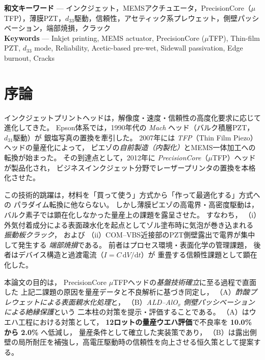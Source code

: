 \documentclass[conference]{IEEEtran}
\begin{document}
\begin{IEEEkeywords}
\textbf{和文キーワード} — インクジェット，MEMSアクチュエータ，PrecisionCore（$\mu$TFP），薄膜PZT，$d_{33}$駆動，信頼性，アセティック系プレウェット，側壁パッシベーション，端部焼損，クラック \\
\textbf{Keywords} — Inkjet printing, MEMS actuator, PrecisionCore ($\mu$TFP), Thin-film PZT, $d_{33}$ mode, Reliability, Acetic-based pre-wet, Sidewall passivation, Edge burnout, Cracks
\end{IEEEkeywords}

\section{序論}
インクジェットプリントヘッドは，解像度・速度・信頼性の高度化要求に応じて進化してきた。
Epson体系では，1990年代の \emph{Mach} ヘッド（バルク積層PZT，$d_{31}$駆動）が
銀塩写真の置換を牽引した\cite{Mach1985}。
2007年には \emph{TFP}（Thin Film Piezo）ヘッドの量産化\cite{TFP2014}によって，
ピエゾの\emph{自前製造（内製化）}とMEMS一体加工への転換が始まった。
その到達点として，2012年に \emph{PrecisionCore}（$\mu$TFP）ヘッドが製品化され，
ビジネスインクジェット分野でレーザープリンタの置換を本格化させた。

この技術的跳躍は，材料を「買って使う」方式から「作って最適化する」方式への
パラダイム転換に他ならない。
しかし薄膜ピエゾの高電界・高密度駆動は，
バルク素子では顕在化しなかった量産上の課題を露呈させた。
すなわち，
（i）外気付着成分による表面疎水化を起点としてゾル塗布時に気泡が巻き込まれる
\emph{振動板クラック}，
および
（ii）COM–VBS近接部のPZT側壁露出で電界が集中して発生する
\emph{端部焼損}である。
前者はプロセス環境・表面化学の管理課題，
後者はデバイス構造と過渡電流（$I=C\,\mathrm{d}V/\mathrm{d}t$）が
重畳する信頼性課題として顕在化した。

本論文の目的は，
PrecisionCore $\mu$TFPヘッドの\emph{基盤技術確立}に至る過程で直面した
上記二課題の原因を量産データと不良解析に基づき同定し，
（A）\emph{酢酸プレウェットによる表面親水化処理}と，
（B）\emph{ALD–AlO$_x$ 側壁パッシベーションによる絶縁保護}という
二本柱の対策を提示・評価することである。
（A）はウエハ工程における対策として，
\textbf{12ロットの量産ウエハ評価}で不良率を \textbf{10.0\% から 2.0\%} へ低減し，
量産条件として確立した実装策であり，
（B）は露出側壁の局所耐圧を補強し，高電圧駆動時の信頼性を向上させる恒久策として提案する。
\end{document}
